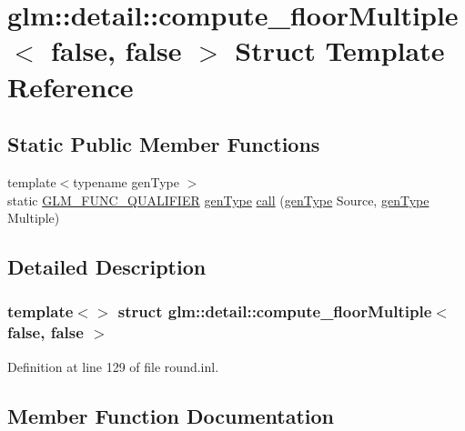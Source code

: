 \hypertarget{structglm_1_1detail_1_1compute__floor_multiple_3_01false_00_01false_01_4}{}\section{glm\+::detail\+::compute\+\_\+floor\+Multiple$<$ false, false $>$ Struct Template Reference}
\label{structglm_1_1detail_1_1compute__floor_multiple_3_01false_00_01false_01_4}
\subsection*{Static Public Member Functions}
\begin{DoxyCompactItemize}
\item 
{\footnotesize template$<$typename gen\+Type $>$ }\\static \mbox{\hyperlink{setup_8hpp_a33fdea6f91c5f834105f7415e2a64407}{G\+L\+M\+\_\+\+F\+U\+N\+C\+\_\+\+Q\+U\+A\+L\+I\+F\+I\+ER}} \mbox{\hyperlink{structglm_1_1detail_1_1gen_type}{gen\+Type}} \mbox{\hyperlink{structglm_1_1detail_1_1compute__floor_multiple_3_01false_00_01false_01_4_a795b0efa8ebff0dcbbc055cdccd2156c}{call}} (\mbox{\hyperlink{structglm_1_1detail_1_1gen_type}{gen\+Type}} Source, \mbox{\hyperlink{structglm_1_1detail_1_1gen_type}{gen\+Type}} Multiple)
\end{DoxyCompactItemize}


\subsection{Detailed Description}
\subsubsection*{template$<$$>$\newline
struct glm\+::detail\+::compute\+\_\+floor\+Multiple$<$ false, false $>$}



Definition at line 129 of file round.\+inl.



\subsection{Member Function Documentation}
\mbox{\label{structglm_1_1detail_1_1compute__floor_multiple_3_01false_00_01false_01_4_a795b0efa8ebff0dcbbc055cdccd2156c}} 
